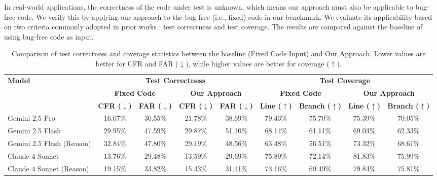 \documentclass[acmsmall]{acmart}
\begin{document}
\label{subsubsec:effect_on_fixed_code}
In real-world applications, the correctness of the code under test is unknown, which means our approach must also be applicable to bug-free code. We verify this by applying our approach to the bug-free (i.e., fixed) code in our benchmark. We evaluate its applicability based on two criteria commonly adopted in prior works \cite{ChatUniTestFSE2024Demo, EvalImprChatgptUTGenFSE2024, TestGenLLMandMutIST, OnLLMUTGenEvalASE2024, EmpEvalforLLMUTAutoGenTSE}: test correctness and test coverage. The results are compared against the baseline of using bug-free code as input.


\begin{table}[ht]
\centering
\tiny
\vspace{-1.0em}
\caption{Comparison of test correctness and coverage statistics between the baseline (Fixed Code Input) and Our Approach. Lower values are better for CFR and FAR ($\downarrow$), while higher values are better for coverage ($\uparrow$).}
\vspace{-0.8em}
\label{tab:correctness_coverage_on_fixed_code}
\begin{tabular}{l|cc|cc|cc|cc}
\toprule
\multirow{3}{*}{\textbf{Model}}
& \multicolumn{4}{c|}{\textbf{Test Correctness}}
& \multicolumn{4}{c}{\textbf{Test Coverage}} \\
\cmidrule(lr){2-5} \cmidrule(lr){6-9}
& \multicolumn{2}{c|}{\textbf{Fixed Code}}
& \multicolumn{2}{c|}{\textbf{Our Approach}}
& \multicolumn{2}{c|}{\textbf{Fixed Code}}
& \multicolumn{2}{c}{\textbf{Our Approach}} \\
\cmidrule(lr){2-3} \cmidrule(lr){4-5} \cmidrule(lr){6-7} \cmidrule(lr){8-9}
& \textbf{CFR ($\downarrow$)}
& \textbf{FAR ($\downarrow$)}
& \textbf{CFR ($\downarrow$)}
& \textbf{FAR ($\downarrow$)}
& \textbf{Line ($\uparrow$)}
& \textbf{Branch ($\uparrow$)}
& \textbf{Line ($\uparrow$)}
& \textbf{Branch ($\uparrow$)} \\
\midrule
Gemini 2.5 Pro & 16.07\% & 30.55\% & 21.78\% & 38.69\% & 79.43\% & 75.70\% & 75.39\% & 70.05\% \\
Gemini 2.5 Flash & 29.95\% & 47.59\% & 29.87\% & 51.10\% & 68.14\% & 61.11\% & 69.03\% & 62.33\% \\
Gemini 2.5 Flash (Reason) & 32.84\% & 47.80\% & 29.19\% & 48.56\% & 63.48\% & 56.51\% & 73.32\% & 68.61\% \\
Claude 4 Sonnet & 13.76\% & 29.48\% & 13.59\% & 29.69\% & 75.89\% & 72.14\% & 81.83\% & 75.99\% \\
Claude 4 Sonnet (Reason) & 19.15\% & 33.82\% & 15.43\% & 31.11\% & 73.16\% & 69.49\% & 79.84\% & 75.81\% \\

\end{tabular}
\end{table}
\end{document}
